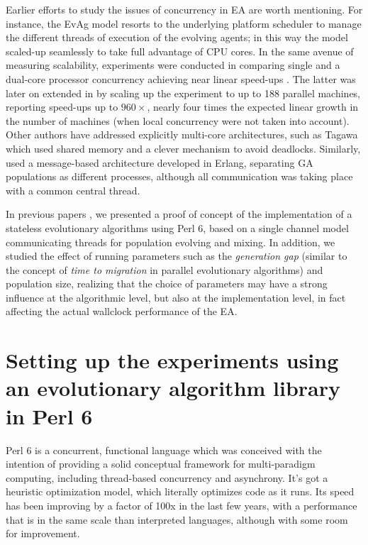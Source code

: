 \documentclass[sigconf]{acmart}\usepackage[]{graphicx}\usepackage[]{color}
\begin{document}
Earlier efforts to study the issues of concurrency in EA are worth 
mentioning. For instance, the EvAg model \cite{evag:gpem} resorts to 
the underlying platform scheduler to manage the different threads of 
execution of the evolving agents; in this way the model scaled-up 
seamlessly to take full advantage of CPU cores. In the same avenue 
of measuring scalability,  experiments were conducted
in \cite{wcci:evoag} comparing single and a dual-core processor 
concurrency achieving near linear speed-ups . The latter
was later on extended in \cite{DBLP:conf/evoW/LaredoBMG12} by scaling
up the experiment to up to 188 parallel machines, reporting speed-ups 
up to $960\times$, nearly four times the expected linear growth 
in the number of machines (when local concurrency were not taken 
into account). Other authors have addressed explicitly multi-core 
architectures, such as Tagawa \cite{Tagawa201212} which used 
shared memory and a clever mechanism to avoid deadlocks. Similarly,
\cite{kerdprasop2012concurrent} used a message-based architecture 
developed in Erlang, separating GA populations as different
processes, although all communication was taking place with a common
central thread. 


In previous papers 
\cite{Merelo:2018:MEA:3205651.3208317:anon,Garcia-Valdez:2018:MEA:3205651.3205719:anon},
we presented a proof of concept of the implementation of a stateless 
evolutionary algorithms using Perl 6, based on a single 
channel model communicating threads for population evolving and 
mixing. In addition, we studied the effect of running parameters 
such as the {\em generation gap} (similar to the concept of {\em
time to migration} in parallel evolutionary algorithms) and 
population size, realizing that the choice of parameters may have 
a strong influence at the algorithmic level, but also at the 
implementation level, in fact affecting the actual wallclock
performance of the EA.

\section{Setting up the experiments using an evolutionary algorithm library in Perl 6}

Perl 6 is a concurrent, functional language
\cite{DBLP:journals/corr/abs-1809-01427} which was conceived with the
intention of providing a solid conceptual framework for multi-paradigm
computing, including thread-based concurrency and asynchrony. It's got
a heuristic optimization model, which literally optimizes code as it
runs. Its speed has been improving by a factor of 100x in the last few
years, with a performance that is in the same scale than interpreted
languages, although with some room for improvement.
\end{document}
